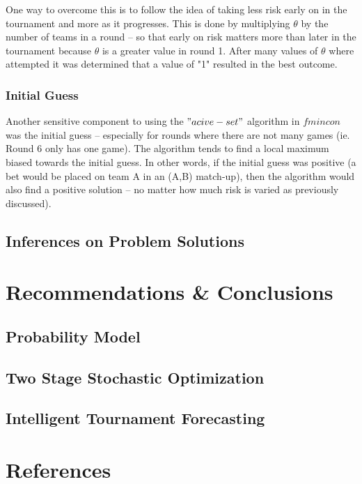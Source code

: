 \documentclass[12pt]{article}
\begin{document}
One way to overcome this is to follow the idea of taking less risk early on in the tournament and more as it progresses.
This is done by multiplying $\theta$ by the number of teams in a round -- so that early on risk matters more than later in the tournament because $\theta$ is a greater value in round 1.
After many values of $\theta$ where attempted it was determined that a value of "1" resulted in the best outcome.

\subsubsection{Initial Guess}
Another sensitive component to using the $"acive-set"$ algorithm in $fmincon$ was the initial guess -- especially for rounds where there are not many games (ie. Round 6 only has one game).
The algorithm tends to find a local maximum biased towards the initial guess.
In other words, if the initial guess was positive (a bet would be placed on team A in an (A,B) match-up), then the algorithm would also find a positive solution -- no matter how much risk is varied as previously discussed).

\subsection{Inferences on Problem Solutions}

\newpage
\section{Recommendations \& Conclusions}
\subsection{Probability Model}

\subsection{Two Stage Stochastic Optimization}

\subsection{Intelligent Tournament Forecasting}

\newpage
\section{References}


\end{document}
